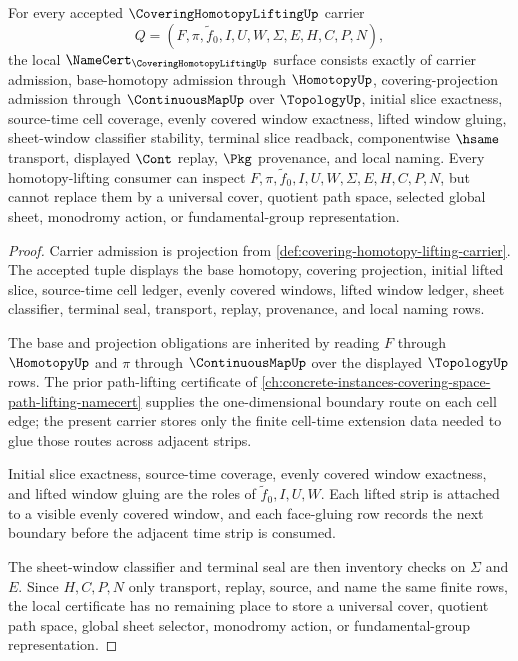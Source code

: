 \begin{theorem}
\label{thm:covering-homotopy-lifting-namecert-obligations}
For every accepted $\CoveringHomotopyLiftingUp$ carrier
$$
Q=(F,\pi,\tilde f_0,I,U,W,\Sigma,E,H,C,P,N),
$$
the local $\NameCert_{\CoveringHomotopyLiftingUp}$ surface consists exactly of carrier admission, base-homotopy admission through $\HomotopyUp$, covering-projection admission through $\ContinuousMapUp$ over $\TopologyUp$, initial slice exactness, source-time cell coverage, evenly covered window exactness, lifted window gluing, sheet-window classifier stability, terminal slice readback, componentwise $\hsame$ transport, displayed $\Cont$ replay, $\Pkg$ provenance, and local naming. Every homotopy-lifting consumer can inspect $F,\pi,\tilde f_0,I,U,W,\Sigma,E,H,C,P,N$, but cannot replace them by a universal cover, quotient path space, selected global sheet, monodromy action, or fundamental-group representation.
\end{theorem}
\begin{proof}
Carrier admission is projection from \autoref{def:covering-homotopy-lifting-carrier}. The accepted tuple displays the base homotopy, covering projection, initial lifted slice, source-time cell ledger, evenly covered windows, lifted window ledger, sheet classifier, terminal seal, transport, replay, provenance, and local naming rows.

The base and projection obligations are inherited by reading $F$ through $\HomotopyUp$ and $\pi$ through $\ContinuousMapUp$ over the displayed $\TopologyUp$ rows. The prior path-lifting certificate of \autoref{ch:concrete-instances-covering-space-path-lifting-namecert} supplies the one-dimensional boundary route on each cell edge; the present carrier stores only the finite cell-time extension data needed to glue those routes across adjacent strips.

Initial slice exactness, source-time coverage, evenly covered window exactness, and lifted window gluing are the roles of $\tilde f_0,I,U,W$. Each lifted strip is attached to a visible evenly covered window, and each face-gluing row records the next boundary before the adjacent time strip is consumed.

The sheet-window classifier and terminal seal are then inventory checks on $\Sigma$ and $E$. Since $H,C,P,N$ only transport, replay, source, and name the same finite rows, the local certificate has no remaining place to store a universal cover, quotient path space, global sheet selector, monodromy action, or fundamental-group representation.
\end{proof}

